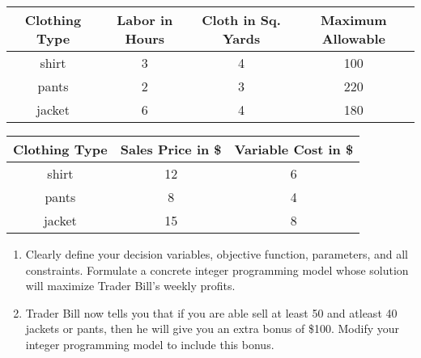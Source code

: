 \begin{enumerate}
\begin{center} \label{table2}

\begin{tabular}{ |c|c|c|c| } 
    \hline
    Clothing Type & Labor in Hours & Cloth in Sq. Yards & Maximum Allowable  \\ 
    \hline
    shirt & 3 & 4 & 100\\
    \hline
    pants & 2 & 3 & 220 \\
    \hline
    jacket & 6 & 4 & 180 \\
    \hline
\end{tabular}
\end{center}

\begin{center} \label{table3}
\begin{tabular}{ |c|c|c| } 
    \hline
    Clothing Type & Sales Price in \$ & Variable Cost in \$  \\ 
    \hline
    shirt & 12 & 6\\
    \hline
    pants & 8 & 4\\
    \hline
    jacket & 15 & 8 \\
    \hline
\end{tabular}
\end{center}

\begin{enumerate}
\item Clearly define your decision variables, objective function, parameters, and all constraints.  Formulate a concrete integer programming model whose solution will maximize Trader Bill's weekly profits.

\vspace{8cm}

\item Trader Bill now tells you that if you are able sell at least 50 and atleast 40 jackets or pants, then he will give you an extra bonus of \$100. Modify your integer programming model to include this bonus.
\end{enumerate}




\end{enumerate}
